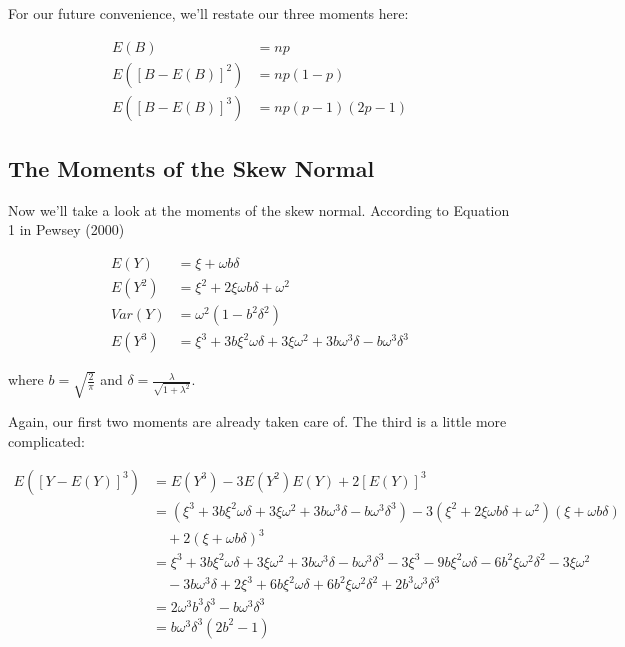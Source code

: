 \documentclass{article}
\begin{document}
For our future convenience, we'll restate our three moments here:

\begin{align}
  E(B) &= np \nonumber \\
  E([B - E(B)]^2) &= np(1-p) \\
  E([B - E(B)]^3) &= np(p-1)(2p-1) \nonumber
\end{align}

\subsection{The Moments of the Skew Normal}

Now we'll take a look at the moments of the skew normal. According to Equation 1 in Pewsey (2000)

\begin{align}
  E(Y) &= \xi + \omega b \delta \nonumber \\
  E(Y^2) &= \xi^2 + 2\xi \omega b \delta + \omega^2 \\
  Var(Y) &= \omega^2 (1 - b^2 \delta^2) \nonumber \\
  E(Y^3) &= \xi^3 + 3 b \xi^2 \omega \delta + 3 \xi \omega^2 + 3 b \omega^3 \delta - b \omega^3
  \delta^3 \nonumber
\end{align}

where $b = \sqrt{\frac{2}{\pi}}$ and $\delta = \frac{\lambda}{\sqrt{1 + \lambda^2}}$.

Again, our first two moments are already taken care of. The third is a little more complicated:

\begin{align}
  E([Y - E(Y)]^3) &= E(Y^3) - 3E(Y^2)E(Y) + 2[E(Y)]^3 \nonumber \\
  &= (\xi^3 + 3 b \xi^2 \omega \delta + 3 \xi \omega^2 + 3 b \omega^3 \delta - b \omega^3 \delta^3)
  - 3 (\xi^2 + 2\xi \omega b \delta + \omega^2) (\xi + \omega b \delta) \nonumber \\
  & \quad + 2(\xi + \omega b \delta)^3 \nonumber \\
  &= \xi^3 + 3 b \xi^2 \omega \delta + 3 \xi \omega^2 + 3 b \omega^3 \delta - b \omega^3 \delta^3 -
  3 \xi^3 - 9 b \xi^2 \omega \delta - 6 b^2 \xi \omega^2 \delta^2 - 3 \xi \omega^2 \nonumber \\
  & \quad - 3 b \omega^3 \delta + 2 \xi^3 + 6 b \xi^2 \omega \delta + 6 b^2 \xi \omega^2 \delta^2 +
  2 b^3 \omega^3 \delta^3 \nonumber \\
  &= 2 \omega^3 b^3 \delta^3 - b \omega^3 \delta^3 \nonumber \\
  &= b \omega^3 \delta^3 (2b^2 - 1)
\end{align}
\end{document}

